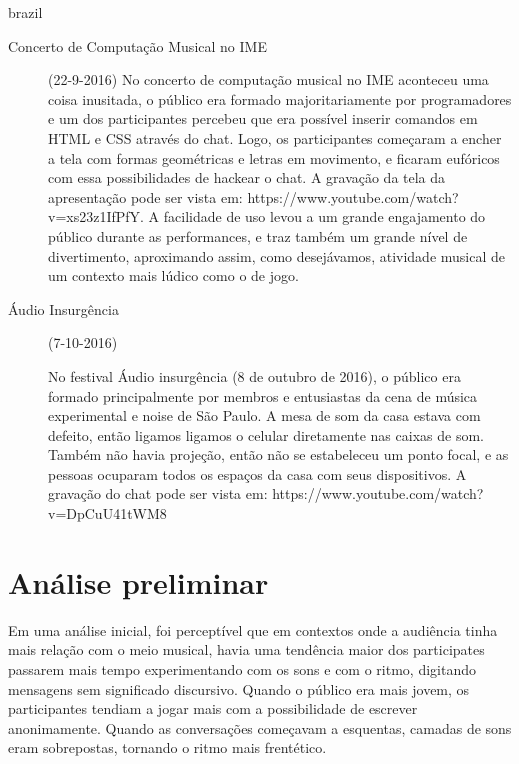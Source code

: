 \begin{otherlanguage*}{brazil}
\begin{description}
\item[Concerto de Computação Musical no IME] (22-9-2016)
No concerto de computação musical no IME aconteceu uma coisa inusitada, o público era formado majoritariamente por programadores e um dos participantes percebeu que era possível inserir comandos em HTML e CSS através do chat. Logo, os participantes começaram a encher a tela com formas geométricas e letras em movimento, e ficaram eufóricos com essa possibilidades de hackear o chat. A gravação da tela da apresentação pode ser vista em: https://www.youtube.com/watch?v=xs23z1IfPfY. A facilidade de uso levou a um grande engajamento do público durante as performances, e traz também um grande nível de divertimento, aproximando assim, como desejávamos, atividade musical de um contexto mais lúdico como o de jogo.

\item[Áudio Insurgência] (7-10-2016)

No festival Áudio insurgência (8 de outubro de 2016), o público era formado principalmente por membros e entusiastas da cena de música experimental e noise de São Paulo. A mesa de som da casa estava com defeito, então ligamos ligamos o celular diretamente nas caixas de som. Também não havia projeção, então não se estabeleceu um ponto focal, e as pessoas ocuparam todos os espaços da casa com seus dispositivos. A gravação do chat pode ser vista em: https://www.youtube.com/watch?v=DpCuU41tWM8 

\end{description}







\section{Análise preliminar}


Em uma análise inicial, foi perceptível que em contextos onde a audiência tinha mais relação com o meio musical, havia uma tendência maior dos participates passarem mais tempo experimentando com os sons e com o ritmo, digitando mensagens sem significado discursivo. Quando o público era mais jovem, os participantes tendiam a jogar mais com a possibilidade de escrever anonimamente. Quando as conversações começavam a esquentas, camadas de sons eram sobrepostas, tornando o ritmo mais frentético.


\end{otherlanguage*}
